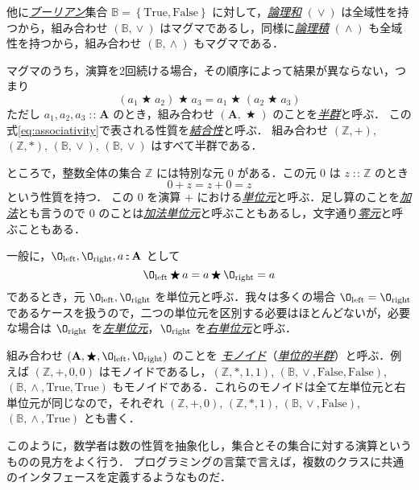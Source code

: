\documentclass[a4paper,draft]{jsbook}
\newcommand{\keyword}[1]{{\underline{\emph{#1}}}}
\newcommand{\mSpecialConst}[1]{\mathrm{#1}} %
\newcommand{\mTrue}{\mSpecialConst{True}}
\newcommand{\mFalse}{\mSpecialConst{False}}
\newcommand{\mZero}{\O}
\newcommand{\mSpecialSub}[1]{\text{#1}}
\newcommand{\mLeft}{\mSpecialSub{left}}
\newcommand{\mRight}{\mSpecialSub{right}}
\newcommand{\mSet}[1]{\mathbf{#1}}
\newcommand{\mSpecialSet}[1]{\mathbb{#1}} %
\newcommand{\mZSet}{\mSpecialSet{Z}}
\newcommand{\mBSet}{\mSpecialSet{B}}
\newcommand{\mSetOf}[1]{\left\{#1\right\}}
\newcommand{\mTupleOf}[1]{\left(#1\right)}
\DeclareMathOperator{\mIn}{{:\!:}}
\DeclareMathOperator{\mBinOp}{\bigstar}
\DeclareMathOperator{\mLogicalAnd}{\wedge}
\DeclareMathOperator{\mLogicalOr}{\vee}
\newcommand{\mathSet}[1]{\mathbf{#1}} %
\begin{document}
他に\keyword{ブーリアン}集合 $\mBSet=\mSetOf{\mTrue,\mFalse}$ に対して，\keyword{論理和} $(\mLogicalOr)$ は全域性を持つから，組み合わせ $\mTupleOf{\mBSet,\mLogicalOr}$ はマグマであるし，同様に\keyword{論理積} $(\mLogicalAnd)$ も全域性を持つから，組み合わせ $\mTupleOf{\mBSet,\mLogicalAnd}$ もマグマである．

マグマのうち，演算を2回続ける場合，その順序によって結果が異ならない，つまり
\begin{equation}
\label{eq:associativity}
\left(a_1\mBinOp a_2\right)\mBinOp a_3
=a_1\mBinOp\left(a_2\mBinOp{a_3}\right)
\end{equation}
ただし $a_1,a_2,a_3\mIn\mSet{A}$ のとき，組み合わせ $\mTupleOf{\mathSet{A},\mBinOp}$ のことを\keyword{半群}と呼ぶ．
この式\eqref{eq:associativity}で表される性質を\keyword{結合性}と呼ぶ．
組み合わせ $\mTupleOf{\mZSet,+}$, $\mTupleOf{\mZSet,*}$, $\mTupleOf{\mBSet,\mLogicalOr}$, $\mTupleOf{\mBSet,\mLogicalOr}$ はすべて半群である．

ところで，整数全体の集合 $\mZSet$ には特別な元 $0$ がある．この元 $0$ は $z\mIn\mZSet$ のとき
\begin{equation}
0+z=z+0=z
\end{equation}
という性質を持つ．
この $0$ を演算 $+$ における\keyword{単位元}と呼ぶ．足し算のことを\keyword{加法}とも言うので $0$ のことは\keyword{加法単位元}と呼ぶこともあるし，文字通り\keyword{零元}と呼ぶこともある．

一般に，$\mZero_\mLeft,\mZero_\mRight,a\mIn\mSet{A}$ として
\begin{equation}
\label{eq:identity}
\mZero_\mLeft\mBinOp a=a\mBinOp\mZero_\mRight=a
\end{equation}
であるとき，元 $\mZero_\mLeft,\mZero_\mRight$ を単位元と呼ぶ．我々は多くの場合 $\mZero_\mLeft=\mZero_\mRight$ であるケースを扱うので，二つの単位元を区別する必要はほとんどないが，必要な場合は $\mZero_\mRight$ を\keyword{左単位元}，$\mZero_\mRight$ を\keyword{右単位元}と呼ぶ．

組み合わせ $\mTupleOf{\mSet{A},\mBinOp,\mZero_\mLeft,\mZero_\mRight}$ のことを
\keyword{モノイド}（\keyword{単位的半群}）と呼ぶ．例えば $\mTupleOf{\mZSet,+,0,0}$ はモノイドであるし，$\mTupleOf{\mZSet,*,1,1}$, $\mTupleOf{\mBSet,\mLogicalOr,\mFalse,\mFalse}$, $\mTupleOf{\mBSet,\mLogicalAnd,\mTrue,\mTrue}$ もモノイドである．これらのモノイドは全て左単位元と右単位元が同じなので，それぞれ $\mTupleOf{\mZSet,+,0}$, $\mTupleOf{\mZSet,*,1}$, $\mTupleOf{\mBSet,\mLogicalOr,\mFalse}$, $\mTupleOf{\mBSet,\mLogicalAnd,\mTrue}$ とも書く．

このように，数学者は数の性質を抽象化し，集合とその集合に対する演算というものの見方をよく行う．
プログラミングの言葉で言えば，複数のクラスに共通のインタフェースを定義するようなものだ．
\end{document}
